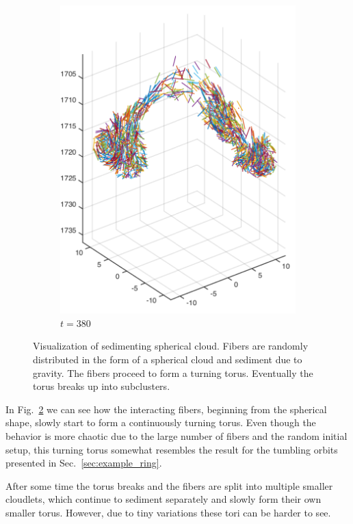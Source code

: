 \begin{figure}[!htbp]
\begin{subfigure}[h]{0.4\textwidth}
    \includegraphics[width=\textwidth]{img/state_00380.pdf}
    \caption{$t=380$}\label{fig:sphere_simulation_1d}
  \end{subfigure}
  \caption[Visualization of sedimenting spherical cloud.]{Visualization of sedimenting spherical cloud. Fibers are randomly distributed in the form of a spherical cloud and sediment due to gravity. The fibers proceed to form a turning torus. Eventually the torus breaks up into subclusters.}
  \label{fig:sphere_simulation}
\end{figure}

In Fig.~\ref{fig:sphere_simulation} we can see how the interacting fibers, beginning from the spherical shape, slowly start to form a continuously turning torus. Even though the behavior is more chaotic due to the large number of fibers and the random initial setup, this turning torus somewhat resembles the result for the tumbling orbits presented in Sec.~\ref{sec:example_ring}.

After some time the torus breaks and the fibers are split into multiple smaller cloudlets, which continue to sediment separately and slowly form their own smaller torus. However, due to tiny variations these tori can be harder to see. 


